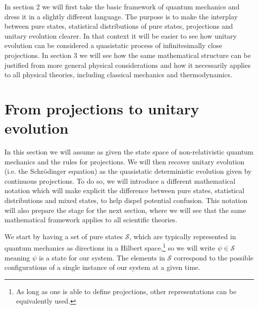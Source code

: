 \documentclass[11pt]{article}
\begin{document}
In section 2 we will first take the basic framework of quantum mechanics and dress it in a slightly different language. The purpose is to make the interplay between pure states, statistical distributions of pure states, projections and unitary evolution clearer. In that context it will be easier to see how unitary evolution can be considered a quasistatic process of infinitesimally close projections. In section 3 we will see how the same mathematical structure can be justified from more general physical considerations and how it necessarily applies to all physical theories, including classical mechanics and thermodynamics. 

\section{From projections to unitary evolution}

In this section we will assume as given the state space of non-relativistic quantum mechanics and the rules for projections. We will then recover unitary evolution (i.e. the Schr\"{o}dinger equation) as the quasistatic deterministic evolution given by continuous projections. To do so, we will introduce a different mathematical notation which will make explicit the difference between pure states, statistical distributions and mixed states, to help dispel potential confusion. This notation will also prepare the stage for the next section, where we will see that the same mathematical framework applies to all scientific theories.

We start by having a set of pure states $\mathcal{S}$, which are typically represented in quantum mechanics as directions in a Hilbert space,\footnote{As long as one is able to define projections, other representations can be equivalently used.} so we will write $\psi \in \mathcal{S}$ meaning $\psi$ is a state for our system. The elements in $\mathcal{S}$ correspond to the possible configurations of a single instance of our system at a given time.
\end{document}
